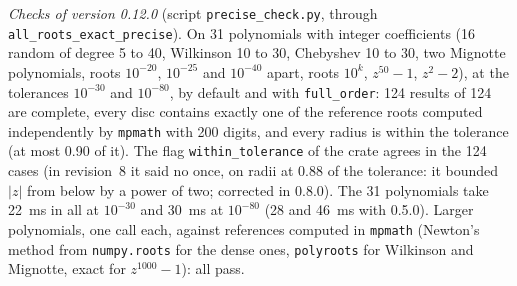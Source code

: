 \documentclass[10pt,a4paper]{article}
\theoremstyle{definition}
\numberwithin{equation}{section}
\begin{document}
\emph{Checks of version 0.12.0} (script \texttt{precise\_check.py}, through \texttt{all\_roots\_exact\_precise}).
On 31 polynomials with integer coefficients (16 random of degree 5 to 40, Wilkinson 10 to 30, Chebyshev
10 to 30, two Mignotte polynomials, roots $10^{-20}$, $10^{-25}$ and $10^{-40}$ apart, roots $10^k$,
$z^{50}-1$, $z^2-2$), at the tolerances $10^{-30}$ and $10^{-80}$, by default and with
\texttt{full\_order}: 124 results of 124 are complete, every disc contains exactly one of the reference
roots computed independently by \texttt{mpmath} with 200 digits, and every radius is within the
tolerance (at most 0.90 of it). The flag \texttt{within\_tolerance} of the crate agrees in the 124 cases
(in revision~8 it said no once, on radii at 0.88 of the tolerance: it bounded $|z|$ from below by a power
of two; corrected in 0.8.0). The 31 polynomials take 22~ms in all at $10^{-30}$ and 30~ms at $10^{-80}$
(28 and 46~ms with 0.5.0). Larger polynomials, one call each, against references
computed in \texttt{mpmath} (Newton's method from \texttt{numpy.roots} for the dense ones,
\texttt{polyroots} for Wilkinson and Mignotte, exact for $z^{1000}-1$): all pass.
\end{document}
